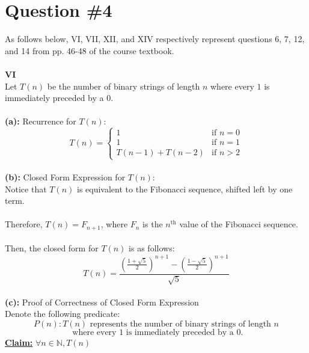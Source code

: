 \documentclass[12pt]{article}
\begin{document}
\section*{Question \#4}
As follows below, VI, VII, XII, and XIV respectively represent questions 6, 7, 12, and 14 from pp. 46-48 of the course textbook. \\
\\
\textbf{VI} \\
Let $T(n)$ be the number of binary strings of length $n$ where every $1$ is immediately preceded by a $0$. \\
\\
\textbf{(a):} Recurrence for $T(n)$: \\
\[
    T(n) =
    \begin{cases}
        1 & \text{if } n = 0 \\
        1 & \text{if } n = 1 \\
        T(n - 1) + T(n - 2) & \text{if } n > 2
    \end{cases}
\]
\\
\textbf{(b):} Closed Form Expression for $T(n)$: \\
Notice that $T(n)$ is equivalent to the Fibonacci sequence, shifted left by one term. \\
\\
Therefore, $T(n) = F_{n + 1}$, where $F_n$ is the $n^{\text{th}}$ value of the Fibonacci sequence. \\
\\
Then, the closed form for $T(n)$ is as follows:
\Large
\[T(n) = \frac{(\frac{1 + \sqrt{5}}{2})^{n + 1} - (\frac{1 - \sqrt{5}}{2})^{n + 1}}{\sqrt{5}}\]
\normalsize
\\
\textbf{(c):} Proof of Correctness of Closed Form Expression \\
Denote the following predicate:
\[P(n): T(n) \text{ represents the number of binary strings of length } n\]
\[\text{ where every $1$ is immediately preceded by a $0$.}\]
\textbf{\underline{Claim:}} $\forall n \in \mathbb{N}, T(n)$
\end{document}
